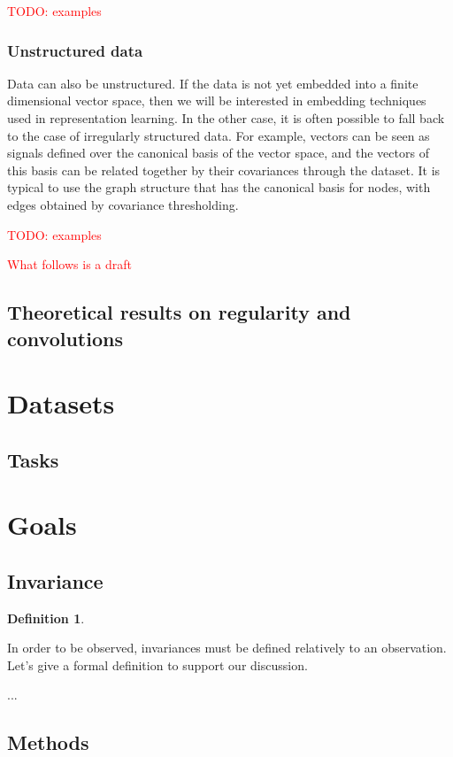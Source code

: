 \documentclass{article}
\theoremstyle{definition}
\newtheorem{definition}{Definition}[section]
\begin{document}
\textcolor{red}{TODO: examples}

\subsubsection{Unstructured data}

Data can also be unstructured. If the data is not yet embedded into a finite dimensional vector space, then we will be interested in embedding techniques used in representation learning. In the other case, it is often possible to fall back to the case of irregularly structured data. For example, vectors can be seen as signals defined over the canonical basis of the vector space, and the vectors of this basis can be related together by their covariances through the dataset. It is typical to use the graph structure that has the canonical basis for nodes, with edges obtained by covariance thresholding.

\textcolor{red}{TODO: examples}


%
%
\textcolor{red}{What follows is a draft}


\subsection{Theoretical results on regularity and convolutions}


\section{Datasets}

\subsection{Tasks} %
\label{tasks}



\section{Goals}

\subsection{Invariance}

\begin{definition}

\end{definition}

In order to be observed, invariances must be defined relatively to an observation. Let's give a formal definition to support our discussion.

...

\subsection{Methods}
\label{methods}
\end{document}
